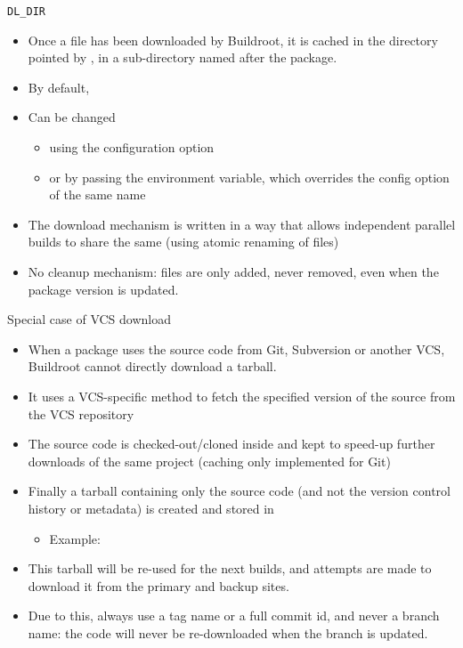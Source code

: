 \begin{frame}{{\tt DL\_DIR}}
  \begin{itemize}
  \item Once a file has been downloaded by Buildroot, it is cached in
    the directory pointed by
    , in a sub-directory named after the package.
  \item By default, 
  \item Can be changed
    \begin{itemize}
    \item using the  configuration option
    \item or by passing the  environment variable,
      which overrides the config option of the same name
    \end{itemize}
  \item The download mechanism is written in a way that allows
    independent parallel builds to share the same  (using
    atomic renaming of files)
  \item No cleanup mechanism: files are only added, never removed,
    even when the package version is updated.
  \end{itemize}
\end{frame}

\begin{frame}{Special case of VCS download}
  \begin{itemize}
  \item When a package uses the source code from Git, Subversion or
    another VCS, Buildroot cannot directly download a tarball.
  \item It uses a VCS-specific method to fetch the specified version
    of the source from the VCS repository
  \item The source code is checked-out/cloned inside  and
    kept to speed-up further downloads of the same project (caching
    only implemented for Git)
  \item Finally a tarball containing only the source code (and not the
    version control history or metadata) is created and stored in
    \begin{itemize}
    \item Example: 
    \end{itemize}
  \item This tarball will be re-used for the next builds, and attempts
    are made to download it from the primary and backup sites.
  \item Due to this, always use a tag name or a full commit id, and
    never a branch name: the code will never be re-downloaded when the
    branch is updated.
  \end{itemize}
\end{frame}

